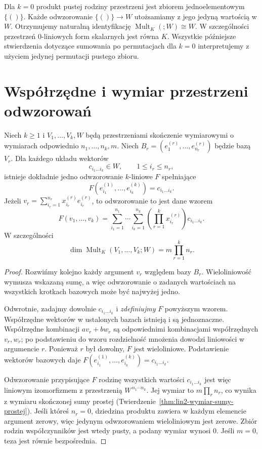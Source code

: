 \begin{uwaga}
\label{rem:lin8-zeroliniowe}
Dla \(k=0\) produkt pustej rodziny
przestrzeni jest zbiorem jednoelementowym
\(\{()\}\). Każde odwzorowanie
\(\{()\}\to W\) utożsamiamy z jego
jedyną wartością w \(W\).
Otrzymujemy naturalną identyfikację
\(\operatorname{Mult}_K(;W)\cong W\).
W szczególności przestrzeń
\(0\)-liniowych form skalarnych
jest równa \(K\).
Wszystkie późniejsze stwierdzenia
dotyczące sumowania po permutacjach
dla \(k=0\) interpretujemy z użyciem
jedynej permutacji pustego zbioru.
\end{uwaga}

\section{Współrzędne i wymiar przestrzeni odwzorowań}
\label{sec:lin8-wspolrzedne}

\begin{twierdzenie}
\label{thm:lin8-wspolrzedne}
Niech \(k\geq1\) i
\(V_1,\ldots,V_k,W\) będą
przestrzeniami skończenie wymiarowymi
o wymiarach odpowiednio
\(n_1,\ldots,n_k,m\).
Niech
\(B_r=(e^{(r)}_1,\ldots,e^{(r)}_{n_r})\)
będzie bazą \(V_r\).
Dla każdego układu wektorów
\[
 c_{i_1\ldots i_k}\in W,\qquad
 1\leq i_r\leq n_r,
\]
istnieje dokładnie jedno odwzorowanie
\(k\)-liniowe \(F\) spełniające
\[
 F(e^{(1)}_{i_1},\ldots,e^{(k)}_{i_k})
 =c_{i_1\ldots i_k}.
\]
Jeżeli
\(v_r=\sum_{i_r=1}^{n_r}
x^{(r)}_{i_r}e^{(r)}_{i_r}\),
to odwzorowanie to jest dane wzorem
\[
 F(v_1,\ldots,v_k)
 =\sum_{i_1=1}^{n_1}\cdots
  \sum_{i_k=1}^{n_k}
  \left(\prod_{r=1}^{k}x^{(r)}_{i_r}\right)
  c_{i_1\ldots i_k}.
\]
W szczególności
\[
 \dim\operatorname{Mult}_K(V_1,\ldots,V_k;W)
 =m\prod_{r=1}^{k}n_r.
\]
\end{twierdzenie}
\begin{proof}
Rozwińmy kolejno każdy argument
\(v_r\) względem bazy \(B_r\).
Wieloliniowość wymusza wskazaną
sumę, a więc odwzorowanie
o zadanych wartościach na
wszystkich krotkach bazowych
może być najwyżej jedno.

Odwrotnie, zadajmy dowolnie
\(c_{i_1\ldots i_k}\)
i \emph{zdefiniujmy} \(F\)
powyższym wzorem. Współrzędne
wektorów w ustalonych bazach
istnieją i są jednoznaczne.
Współrzędne kombinacji
\(av_r+bw_r\) są odpowiednimi
kombinacjami współrzędnych
\(v_r,w_r\); po podstawieniu
do wzoru rozdzielność mnożenia
dowodzi liniowości w argumencie
\(r\). Ponieważ \(r\) był dowolny,
\(F\) jest wieloliniowe.
Podstawienie wektorów bazowych
daje \(F(e^{(1)}_{i_1},\ldots,
e^{(k)}_{i_k})=c_{i_1\ldots i_k}\).

Odwzorowanie przypisujące \(F\)
rodzinę wszystkich wartości
\(c_{i_1\ldots i_k}\)
jest więc liniowym izomorfizmem
z przestrzenią
\(W^{\,n_1\cdots n_k}\).
Jej wymiar to
\(m\prod_r n_r\), co wynika
z wymiaru skończonej sumy prostej
(Twierdzenie~\ref{thm:lin2-wymiar-sumy-prostej}).
Jeśli któreś \(n_r=0\), dziedzina
produktu zawiera w każdym elemencie
argument zerowy, więc jedynym
odwzorowaniem wieloliniowym
jest zerowe. Zbiór rodzin
współczynników jest wtedy pusty,
a podany wymiar wynosi \(0\).
Jeśli \(m=0\), teza jest równie
bezpośrednia.
\end{proof}


